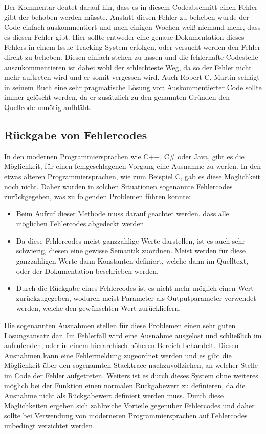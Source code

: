 \SuperPar Der Kommentar deutet darauf hin, dass es in diesem Codeabschnitt einen Fehler gibt der behoben werden müsste. Anstatt diesen Fehler zu beheben wurde der Code einfach auskommentiert und nach einigen Wochen weiß niemand mehr, dass es diesen Fehler gibt. Hier sollte entweder eine genaue Dokumentation dieses Fehlers in einem Issue Tracking System erfolgen, oder versucht werden den Fehler direkt zu beheben. Diesen einfach stehen zu lassen und die fehlerhafte Codestelle auszukommentieren ist dabei wohl der schlechteste Weg, da so der Fehler nicht mehr auftreten wird und er somit vergessen wird. Auch Robert C. Martin schlägt in seinem Buch eine sehr pragmatische Lösung vor: Auskommentierter Code sollte immer gelöscht werden, da er zusätzlich zu den genannten Gründen den Quellcode unnötig aufbläht.

\subsection{Rückgabe von Fehlercodes}
In den modernen Programmiersprachen wie C++, C\# oder Java, gibt es die Möglichkeit, für einen fehlgeschlagenen Vorgang eine Ausnahme zu werfen. In den etwas älteren Programmiersprachen, wie zum Beispiel C, gab es diese Möglichkeit noch nicht. Daher wurden in solchen Situationen sogenannte Fehlercodes zurückgegeben, was zu folgenden Problemen führen konnte:

\begin{itemize}
	\item Beim Aufruf dieser Methode muss darauf geachtet werden, dass alle möglichen Fehlercodes abgedeckt werden. 
	\item Da diese Fehlercodes meist ganzzahlige Werte darstellen, ist es auch sehr schwierig, diesen eine gewisse Semantik zuordnen. Meist werden für diese ganzzahligen Werte dann Konstanten definiert, welche dann im Quelltext, oder der Dokumentation beschrieben werden. 
	\item Durch die Rückgabe eines Fehlercodes ist es nicht mehr möglich einen Wert zurückzugegeben, wodurch meist Parameter als Outputparameter verwendet werden, welche den gewünschten Wert zurückliefern.
\end{itemize}

\SuperPar Die sogenannten Ausnahmen stellen für diese Problemen einen sehr guten Lösungsansatz dar. Im Fehlerfall wird eine Ausnahme ausgelöst und schließlich im aufrufenden, oder in einem hierarchisch höheren Bereich behandelt. Diesen Ausnahmen kann eine Fehlermeldung zugeordnet werden und es gibt die Möglichkeit über den sogenannten Stacktrace nachzuvollziehen, an welcher Stelle im Code der Fehler aufgetreten. Weiters ist es durch dieses System ohne weiteres möglich bei der Funktion einen normalen Rückgabewert zu definieren, da die Ausnahme nicht als Rückgabewert definiert werden muss. Durch diese Möglichkeiten ergeben sich zahlreiche Vorteile gegenüber Fehlercodes und daher sollte bei Verwendung von moderneren Programmiersprachen auf Fehlercodes unbedingt verzichtet werden.

